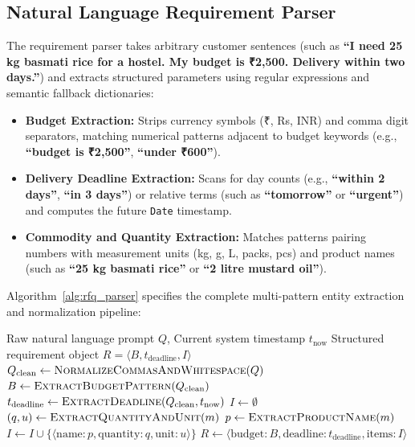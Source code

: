 \subsection{Natural Language Requirement Parser}
The requirement parser takes arbitrary customer sentences (such as \textbf{``I need 25 kg basmati rice for a hostel. My budget is ₹2,500. Delivery within two days.''}) and extracts structured parameters using regular expressions and semantic fallback dictionaries:

\begin{itemize}
    \item \textbf{Budget Extraction:} Strips currency symbols (₹, Rs, INR) and comma digit separators, matching numerical patterns adjacent to budget keywords (e.g., \textbf{``budget is ₹2,500''}, \textbf{``under ₹600''}).
    \item \textbf{Delivery Deadline Extraction:} Scans for day counts (e.g., \textbf{``within 2 days''}, \textbf{``in 3 days''}) or relative terms (such as \textbf{``tomorrow''} or \textbf{``urgent''}) and computes the future \texttt{Date} timestamp.
    \item \textbf{Commodity and Quantity Extraction:} Matches patterns pairing numbers with measurement units (kg, g, L, packs, pcs) and product names (such as \textbf{``25 kg basmati rice''} or \textbf{``2 litre mustard oil''}).
\end{itemize}

Algorithm~\ref{alg:rfq_parser} specifies the complete multi-pattern entity extraction and normalization pipeline:

\begin{algorithm}[H]
\caption{Natural Language Shopping Requirement Parser (\texttt{rfqParser.js})}
\label{alg:rfq_parser}
\begin{algorithmic}[1]
\Require Raw natural language prompt $Q$, Current system timestamp $t_{\text{now}}$
\Ensure Structured requirement object $R = \langle B, t_{\text{deadline}}, I \rangle$
\State $Q_{\text{clean}} \gets \textsc{NormalizeCommasAndWhitespace}(Q)$
\State $B \gets \textsc{ExtractBudgetPattern}(Q_{\text{clean}})$ 
\State $t_{\text{deadline}} \gets \textsc{ExtractDeadline}(Q_{\text{clean}}, t_{\text{now}})$ 
\State $I \gets \emptyset$
    \State $(q, u) \gets \textsc{ExtractQuantityAndUnit}(m)$ 
    \State $p \gets \textsc{ExtractProductName}(m)$ 
    \State $I \gets I \cup \{\langle \text{name}: p, \text{quantity}: q, \text{unit}: u \rangle\}$
\EndFor
\State \Return $R \gets \langle \text{budget}: B, \text{deadline}: t_{\text{deadline}}, \text{items}: I \rangle$
\end{algorithmic}
\end{algorithm}


